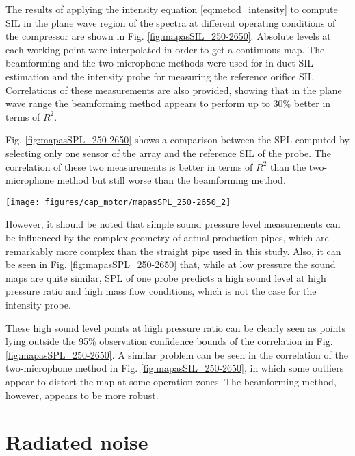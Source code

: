 The results of applying the intensity equation \ref{eq:metod_intensity} to compute SIL in the plane wave region of the spectra at different operating conditions of the compressor are shown in Fig. \ref{fig:mapasSIL_250-2650}. Absolute levels at each working point were interpolated in order to get a continuous map. The beamforming and the two-microphone methods were used for in-duct SIL estimation and the intensity probe for measuring the reference orifice SIL. Correlations of these measurements are also provided, showing that in the plane wave range the beamforming method appears to perform up to 30\% better in terms of $R^2$.

Fig. \ref{fig:mapasSPL_250-2650} shows a comparison between the SPL computed by selecting only one sensor of the array and the reference SIL of the probe. The correlation of these two measurements is better in terms of $R^2$ than the two-microphone method but still worse than the beamforming method.

\begin{figure*}[tb!]
\centering
\texttt{[image: figures/cap\_motor/mapasSPL\_250-2650\_2]}
\caption[Maps and correlation of SPL vs. orifice SIL]{Comparison of compressor sound maps (plane wave region) obtained through interpolation of SPL at the inlet 1\textsuperscript{st} sensor and SIL at the probe, including a correlation between both.}
\label{fig:mapasSPL_250-2650}
\end{figure*}

However, it should be noted that simple sound pressure level measurements can be influenced by the complex geometry of actual production pipes, which are remarkably more complex than the straight pipe used in this study. Also, it can be seen in Fig. \ref{fig:mapasSPL_250-2650} that, while at low pressure the sound maps are quite similar, SPL of one probe predicts a high sound level at high pressure ratio and high mass flow conditions, which is not the case for the intensity probe.

These high sound level points at high pressure ratio can be clearly seen as points lying outside the 95\% observation confidence bounds of the correlation in Fig. \ref{fig:mapasSPL_250-2650}. A similar problem can be seen in the correlation of the two-microphone method in Fig. \ref{fig:mapasSIL_250-2650}, in which some outliers appear to distort the map at some operation zones. The beamforming method, however, appears to be more robust.

\section{Radiated noise}
\label{sub:radiated_noise_measurement}

